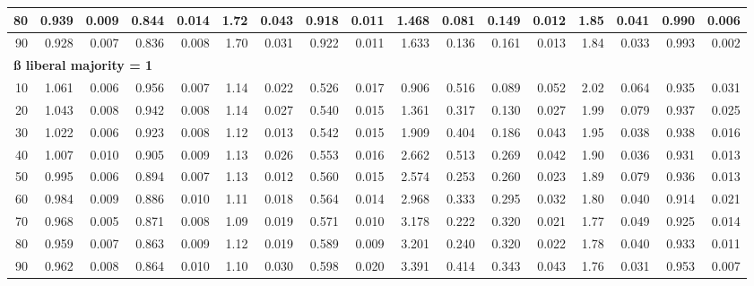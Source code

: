 \documentclass[
]{article}
\begin{document}
\begin{table}[H]
\begin{table}
{\begin{tabular}{r|r|r|r|r|r|r|r|r|r|r|r|r|r|r|r|r}
\hline
\hspace{1em}80 & 0.939 & 0.009 & 0.844 & 0.014 & 1.72 & 0.043 & 0.918 & 0.011 & 1.468 & 0.081 & 0.149 & 0.012 & 1.85 & 0.041 & 0.990 & 0.006\\
\hline
\hspace{1em}90 & 0.928 & 0.007 & 0.836 & 0.008 & 1.70 & 0.031 & 0.922 & 0.011 & 1.633 & 0.136 & 0.161 & 0.013 & 1.84 & 0.033 & 0.993 & 0.002\\
\hline
\multicolumn{17}{l}{\textbf{ß liberal majority = 1}}\\
\hline
\hspace{1em}10 & 1.061 & 0.006 & 0.956 & 0.007 & 1.14 & 0.022 & 0.526 & 0.017 & 0.906 & 0.516 & 0.089 & 0.052 & 2.02 & 0.064 & 0.935 & 0.031\\
\hline
\hspace{1em}20 & 1.043 & 0.008 & 0.942 & 0.008 & 1.14 & 0.027 & 0.540 & 0.015 & 1.361 & 0.317 & 0.130 & 0.027 & 1.99 & 0.079 & 0.937 & 0.025\\
\hline
\hspace{1em}30 & 1.022 & 0.006 & 0.923 & 0.008 & 1.12 & 0.013 & 0.542 & 0.015 & 1.909 & 0.404 & 0.186 & 0.043 & 1.95 & 0.038 & 0.938 & 0.016\\
\hline
\hspace{1em}40 & 1.007 & 0.010 & 0.905 & 0.009 & 1.13 & 0.026 & 0.553 & 0.016 & 2.662 & 0.513 & 0.269 & 0.042 & 1.90 & 0.036 & 0.931 & 0.013\\
\hline
\hspace{1em}50 & 0.995 & 0.006 & 0.894 & 0.007 & 1.13 & 0.012 & 0.560 & 0.015 & 2.574 & 0.253 & 0.260 & 0.023 & 1.89 & 0.079 & 0.936 & 0.013\\
\hline
\hspace{1em}60 & 0.984 & 0.009 & 0.886 & 0.010 & 1.11 & 0.018 & 0.564 & 0.014 & 2.968 & 0.333 & 0.295 & 0.032 & 1.80 & 0.040 & 0.914 & 0.021\\
\hline
\hspace{1em}70 & 0.968 & 0.005 & 0.871 & 0.008 & 1.09 & 0.019 & 0.571 & 0.010 & 3.178 & 0.222 & 0.320 & 0.021 & 1.77 & 0.049 & 0.925 & 0.014\\
\hline
\hspace{1em}80 & 0.959 & 0.007 & 0.863 & 0.009 & 1.12 & 0.019 & 0.589 & 0.009 & 3.201 & 0.240 & 0.320 & 0.022 & 1.78 & 0.040 & 0.933 & 0.011\\
\hline
\hspace{1em}90 & 0.962 & 0.008 & 0.864 & 0.010 & 1.10 & 0.030 & 0.598 & 0.020 & 3.391 & 0.414 & 0.343 & 0.043 & 1.76 & 0.031 & 0.953 & 0.007\\

\end{tabular}}
\end{table}
\end{table}
\end{document}
